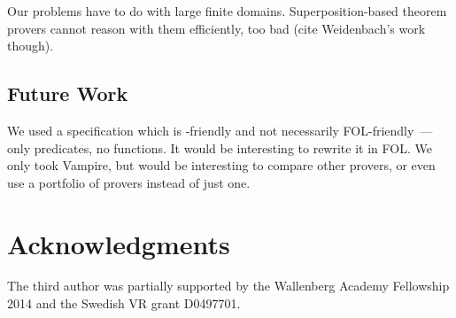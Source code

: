 Our problems have to do with large finite domains. Superposition-based theorem provers cannot reason with them efficiently, too bad (cite Weidenbach's work~\cite{HillenbrandWeidenbach13} though).

\subsection{Future Work}
We used a specification which is \Datalog-friendly and not necessarily FOL-friendly~--- only predicates, no functions. It would be interesting to rewrite it in FOL. We only took Vampire, but would be interesting to compare other provers, or even use a portfolio of provers instead of just one.

\section*{Acknowledgments}
\label{sect:aws/acks}
The third author was partially supported by the Wallenberg Academy Fellowship 2014 and the Swedish VR grant D0497701.
